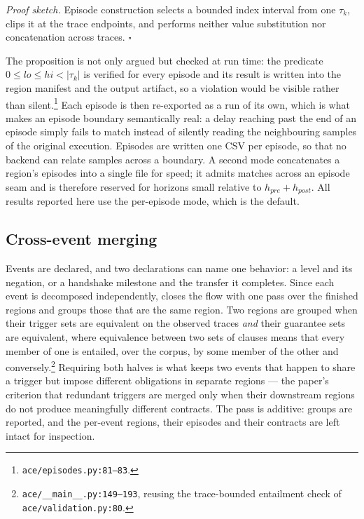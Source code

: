 \emph{Proof sketch.} Episode construction selects a bounded index interval from one $\tau_k$,
clips it at the trace endpoints, and performs neither value substitution nor concatenation
across traces. \hfill$\square$

The proposition is not only argued but checked at run time: the predicate
$0\le lo\le hi<|\tau_k|$ is verified for every episode and its result is written into the
region manifest and the output artifact, so a violation would be visible rather than
silent.\footnote{\texttt{ace/episodes.py:81--83}.} Each episode is then re-exported as a run
of its own, which is what makes an episode boundary semantically real: a delay reaching past
the end of an episode simply fails to match instead of silently reading the neighbouring
samples of the original execution. Episodes are written one CSV per episode, so that no
backend can relate samples across a boundary. A second mode concatenates a region's episodes
into a single file for speed; it admits matches across an episode seam and is therefore
reserved for horizons small relative to $h_{pre}+h_{post}$. All results reported here use the
per-episode mode, which is the default.

\subsection{Cross-event merging}
Events are declared, and two declarations can name one behavior: a level and its negation, or
a handshake milestone and the transfer it completes. Since each event is decomposed
independently, \ACE{} closes the flow with one pass over the finished regions and groups those
that are the same region. Two regions are grouped when their trigger sets are equivalent on
the observed traces \emph{and} their guarantee sets are equivalent, where equivalence between
two sets of clauses means that every member of one is entailed, over the corpus, by some
member of the other and conversely.\footnote{\texttt{ace/\_\_main\_\_.py:149--193}, reusing the
trace-bounded entailment check of \texttt{ace/validation.py:80}.} Requiring both halves is
what keeps two events that happen to share a trigger but impose different obligations in
separate regions — the paper's criterion that redundant triggers are merged only when their
downstream regions do not produce meaningfully different contracts. The pass is additive:
groups are reported, and the per-event regions, their episodes and their contracts are left
intact for inspection.

